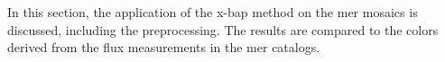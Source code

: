 In this section, the application of the \gls{x-bap} method on the \gls{mer} mosaics is discussed, including the preprocessing. The results are compared to the colors derived from the flux measurements in the \gls{mer} catalogs. 


